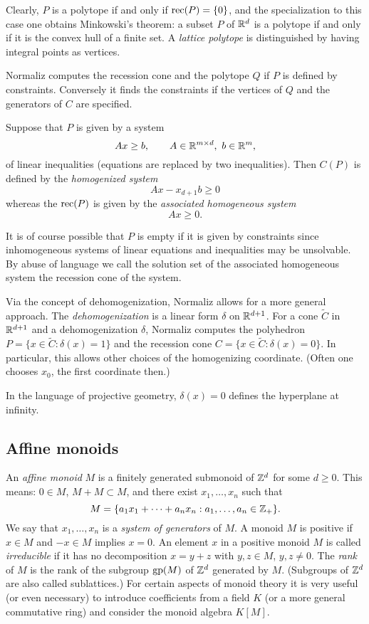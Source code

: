 Clearly, $P$ is a polytope if and only if $\operatorname{rec}(P)=\{0\}$, and the specialization to this case one obtains Minkowski's theorem: a subset $P$ of ${\mathbb R}^d$ is a polytope if and only if it is the convex hull of a finite set. A \emph{lattice polytope} is distinguished by having integral points as vertices.

Normaliz computes the recession cone and the polytope $Q$ if $P$ is defined by constraints. Conversely it finds the constraints if the vertices of $Q$ and the generators of $C$ are specified.

Suppose that $P$ is given by a system
$$
Ax\ge b, \qquad A\in{\mathbb R}^{m\times d},\ b\in {\mathbb R}^m,
$$
of linear inequalities (equations are replaced by two inequalities). Then $C(P)$ is defined by the \emph{homogenized system}
$$
Ax-x_{d+1}b\ge 0
$$
whereas the $\operatorname{rec}(P)$ is given by the \emph{associated homogeneous system}
$$
Ax\ge 0.
$$

It is of course possible that $P$ is empty if it is given by constraints since inhomogeneous systems of linear equations and inequalities may be unsolvable. By abuse of language we call the solution set of the associated homogeneous system the recession cone of the system.

Via the concept of dehomogenization, Normaliz allows for a more general approach. The \emph{dehomogenization} is a linear form $\delta$ on ${\mathbb R}^{d+1}$. For a cone $\widetilde C$ in ${\mathbb R}^{d+1}$ and a dehomogenization $\delta$, Normaliz computes the polyhedron $P=\{x\in \widetilde C: \delta(x)=1\}$ and the recession cone $C=\{x\in \widetilde C: \delta(x)=0\}$. In particular, this allows other choices of the homogenizing coordinate. (Often one chooses $x_0$, the first coordinate then.)

In the language of projective geometry, $\delta(x)=0$ defines the hyperplane at infinity.

\subsection{Affine monoids}

An \emph{affine monoid} $M$ is a finitely generated submonoid of ${\mathbb Z}^d$ for some $d\ge0$. This means: $0\in M$, $M+M\subset M$, and there exist $x_1,\dots,x_n$ such that
$$
M=\{a_1x_1+\dots+a_nx_n: a_1,\dots,a_n\in{\mathbb Z}_+\}.
$$
We say that $x_1,\dots,x_n$ is a \emph{system of generators} of $M$. A monoid $M$ is positive if $x\in M$ and $-x\in M$ implies $x=0$. An element $x$ in a positive monoid $M$ is called \emph{irreducible} if it has no decomposition $x=y+z$ with $y,z\in M$, $y,z\neq0$. The \emph{rank} of $M$ is the rank of the subgroup $\operatorname{gp}(M)$ of ${\mathbb Z}^d$ generated by $M$. (Subgroups of ${\mathbb Z}^d$ are also called sublattices.)
For certain aspects of monoid theory it is very useful (or even necessary) to introduce coefficients from a field $K$ (or a more general commutative ring) and consider the monoid algebra $K[M]$.


